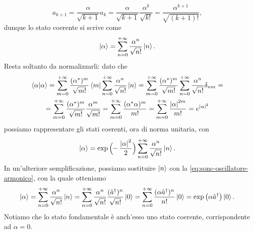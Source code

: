 \begin{equation}
	a_{k+1}=\frac{\alpha}{\sqrt{k+1}}a_k=\frac{\alpha}{\sqrt{k+1}}\frac{\alpha^k}{\sqrt{k!}}=\frac{\alpha^{k+1}}{\sqrt{(k+1)!}},
\end{equation}
dunque lo stato coerente si scrive come
\begin{equation}
	\left|{\alpha}\right\rangle=\sum_{n=0}^{+\infty}\frac{\alpha^n}{\sqrt{n!}}\left|{n}\right\rangle.
\end{equation}
Resta soltanto da normalizzarli: dato che
\begin{multline}
	\left\langle{\alpha}\middle|{\alpha}\right\rangle=\sum_{m=0}^{+\infty}\frac{(\alpha^*)^m}{\sqrt{m!}}\left\langle{m}\right|\sum_{n=0}^{+\infty}\frac{\alpha^n}{\sqrt{n!}}\left|{n}\right\rangle=
	\sum_{m=0}^{+\infty}\frac{(\alpha^*)^m}{\sqrt{m!}}\sum_{n=0}^{+\infty}\frac{\alpha^n}{\sqrt{n!}}\delta_{nm}=\\=
	\sum_{m=0}^{+\infty}\frac{(\alpha^*)^m}{\sqrt{m!}}\frac{\alpha^m}{\sqrt{m!}}=
	\sum_{m=0}^{+\infty}\frac{(\alpha^*\alpha)^m}{m!}=
	\sum_{m=0}^{+\infty}\frac{\left|{\alpha}\right|^{2m}}{m!}=
	e^{\left|{\alpha}\right|^2}
	\label{eq:norma-stato-coerente}
\end{multline}
possiamo rappresentare gli stati coerenti, ora di norma unitaria, con
\begin{equation}
	\left|{\alpha}\right\rangle=\exp\Big(\!\!-\frac{\left|{\alpha}\right|^2}2\Big)\sum_{{n}=0}^{+\infty}\frac{\alpha^n}{\sqrt{n!}}\left|{n}\right\rangle.
	\label{eq:stato-coerente-normalizzato}
\end{equation}
In un'ulteriore semplificazione, possiamo sostituire $\left|{n}\right\rangle$ con la \eqref{eq:sonc-oscillatore-armonico}, con la quale otteniamo
\begin{equation}
	\left|{\alpha}\right\rangle=\sum_{{n}=0}^{+\infty}\frac{\alpha^n}{\sqrt{n!}}\left|{n}\right\rangle=\sum_{{n}=0}^{+\infty}\frac{\alpha^n}{\sqrt{n!}}\frac{({\hat{a}}^\dagger)^n}{\sqrt{n!}}\left|{0}\right\rangle=\sum_{{n}=0}^{+\infty}\frac{(\alpha{\hat{a}}^\dagger)^n}{n!}\left|{0}\right\rangle=\exp\big(\alpha{\hat{a}}^\dagger\big)\left|{0}\right\rangle.
	\label{eq:stato-coerente-exp}
\end{equation}
Notiamo che lo stato fondamentale è anch'esso uno stato coerente, corrispondente ad $\alpha=0$.

